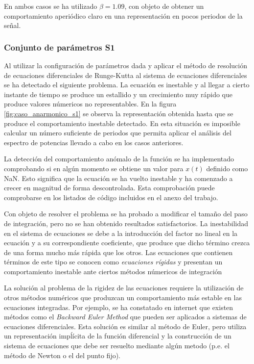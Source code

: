 \documentclass[11pt]{article}
\begin{document}
En ambos casos se ha utilizado $\beta=1.09$, con objeto de obtener un
comportamiento aperiódico claro en una representación en pocos periodos de la
señal.

\subsubsection{Conjunto de parámetros S1}
Al utilizar la configuración de parámetros dada y aplicar el método de
resolución de ecuaciones diferenciales de Runge-Kutta al sistema de ecuaciones
diferenciales se ha detectado el siguiente problema. La ecuación es inestable y
al llegar a cierto instante de tiempo se produce un estallido y un crecimiento
muy rápido que produce valores númericos no representables. En la figura
\ref{fig:caso_anarmonico_s1} se observa la representación obtenida hasta que se
produce el comportamiento inestable detectado. En esta situación es imposible
calcular un número suficiente de periodos que permita aplicar el análisis del
espectro de potencias llevado a cabo en los casos anteriores.

La detección del comportamiento anómalo de la función se ha implementado
comprobando si en algún momento se obtiene un valor para $x(t)$ definido 
como NaN. Esto significa que la ecuación se ha vuelto inestable y ha comenzado 
a crecer en magnitud de forma descontrolada. Esta comprobación puede comprobarse
en los listados de código incluidos en el anexo del trabajo.

Con objeto de resolver el problema se ha probado a modificar el tamaño del paso
de integración, pero no se han obtenido resultados satisfactorios. La
inestabilidad en el sistema de ecuaciones se debe a la introducción del factor
no lineal en la ecuación y a su correspondiente coeficiente, que produce que
dicho término crezca de una forma mucho más rápida que los otros. Las
ecuaciones que contienen términos de este tipo se conocen como
\textit{ecuaciones rígidas} y presentan un comportamiento inestable ante ciertos
métodos númericos de integración

La solución al problema de la rigidez de las ecuaciones requiere la utilización
de otros métodos numéricos que produzcan un comportamiento más estable en las
ecuaciones integradas. Por ejemplo, se ha constatado en internet que existen
métodos como el \textit{Backward Euler Method} que pueden ser aplicados a
sistemas de ecuaciones diferenciales. Esta solución es similar al método de
Euler, pero utiliza un representación impĺícita de la función diferencial y la
construcción de un sistema de ecuaciones que debe ser resuelto mediante algún
metodo (p.e. el método de Newton o el del punto fijo). 
\end{document}
